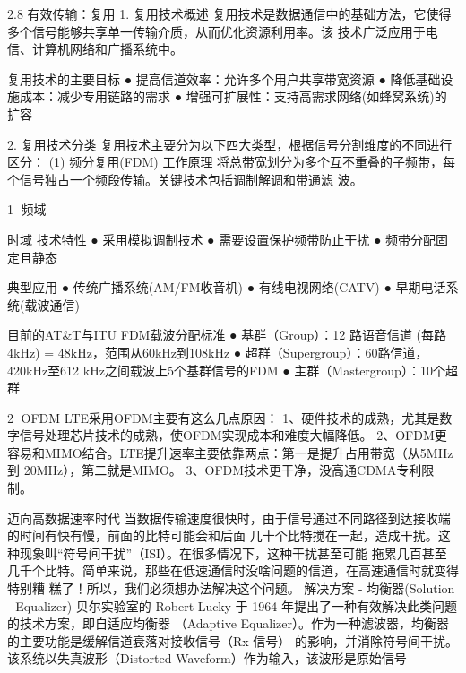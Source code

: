 
2.8 有效传输：复用
1. 复用技术概述
复用技术是数据通信中的基础方法，它使得多个信号能够共享单一传输介质，从而优化资源利用率。该
技术广泛应用于电信、计算机网络和广播系统中。




复用技术的主要目标
 ● 提高信道效率：允许多个用户共享带宽资源
 ● 降低基础设施成本：减少专用链路的需求
 ● 增强可扩展性：支持高需求网络(如蜂窝系统)的扩容



2. 复用技术分类
复用技术主要分为以下四大类型，根据信号分割维度的不同进行区分：
(1) 频分复用(FDM)
工作原理
将总带宽划分为多个互不重叠的子频带，每个信号独占一个频段传输。关键技术包括调制解调和带通滤
波。




                                                1
频域




时域
技术特性
 ● 采用模拟调制技术
 ● 需要设置保护频带防止干扰
 ● 频带分配固定且静态


典型应用
 ● 传统广播系统(AM/FM收音机)
 ● 有线电视网络(CATV)
 ● 早期电话系统(载波通信)

目前的AT&T与ITU FDM载波分配标准
 ● 基群（Group）：12 路语音信道 (每路4kHz) = 48kHz，范围从60kHz到108kHz
 ● 超群（Supergroup）：60路信道，420kHz至612 kHz之间载波上5个基群信号的FDM
 ● 主群（Mastergroup）：10个超群




                                                         2
OFDM
LTE采用OFDM主要有这么几点原因：
1、硬件技术的成熟，尤其是数字信号处理芯片技术的成熟，使OFDM实现成本和难度大幅降低。
2、OFDM更容易和MIMO结合。LTE提升速率主要依靠两点：第一是提升占用带宽（从5MHz到
20MHz），第二就是MIMO。
3、OFDM技术更干净，没高通CDMA专利限制。

迈向高数据速率时代
当数据传输速度很快时，由于信号通过不同路径到达接收端的时间有快有慢，前面的比特可能会和后面
几十个比特搅在一起，造成干扰。这种现象叫“符号间干扰”（ISI）。在很多情况下，这种干扰甚至可能
拖累几百甚至几千个比特。简单来说，那些在低速通信时没啥问题的信道，在高速通信时就变得特别糟
糕了！所以，我们必须想办法解决这个问题。
解决方案 - 均衡器(Solution - Equalizer)
贝尔实验室的 Robert Lucky 于 1964 年提出了一种有效解决此类问题的技术方案，即自适应均衡器
（Adaptive Equalizer）。作为一种滤波器，均衡器的主要功能是缓解信道衰落对接收信号（Rx 信号）
的影响，并消除符号间干扰。该系统以失真波形（Distorted Waveform）作为输入，该波形是原始信号

